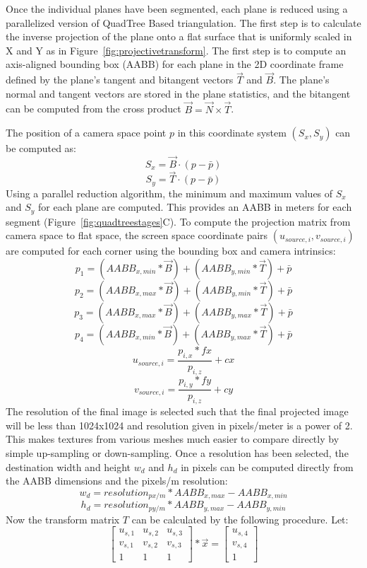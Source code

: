 Once the individual planes have been segmented, each plane is reduced using a parallelized version of QuadTree Based triangulation\cite{planesegmentationQTB}. The first step is to calculate the inverse projection of the plane onto a flat surface that is uniformly scaled in X and Y as in Figure~\ref{fig:projectivetransform}.
The first step is to compute an axis-aligned bounding box (AABB) for each plane in the 2D coordinate frame defined by the plane's tangent and bitangent vectors $\vec{T}$ and $\vec{B}$. The plane's normal and tangent vectors are stored in the plane statistics, and the bitangent can be computed from the cross product $\vec{B}=\vec{N} \times \vec{T}$.\par
The position of a camera space point $p$ in this coordinate system $(S_x,S_y)$ can be computed as: $$S_x=\vec{B} \cdot (p - \bar{p})$$ $$S_y=\vec{T} \cdot (p - \bar{p})$$
Using a parallel reduction algorithm, the minimum and maximum values of $S_x$ and $S_y$ for each plane are computed. This provides an AABB in meters for each segment (Figure~\ref{fig:quadtreestages}C). To compute the projection matrix from camera space to flat space, the screen space coordinate pairs $(u_{source,i},v_{source,i})$ are computed for each corner using the bounding box and camera intrinsics: 
$$p_1 = (AABB_{x,min} * \vec{B})+(AABB_{y,min} * \vec{T})+\bar{p}$$
$$p_2 = (AABB_{x,max} * \vec{B})+(AABB_{y,min} * \vec{T})+\bar{p}$$
$$p_3 = (AABB_{x,max} * \vec{B})+(AABB_{y,max} * \vec{T})+\bar{p}$$
$$p_4 = (AABB_{x,min} * \vec{B})+(AABB_{y,max} * \vec{T})+\bar{p}$$
$$u_{source,i} = \frac{p_{i,x}*fx}{p_{i,z}} + cx$$
$$v_{source,i} = \frac{p_{i,y}*fy}{p_{i,z}} + cy$$
The resolution of the final image is selected such that the final projected image will be less than 1024x1024 and resolution given in pixels/meter is a power of 2. This makes textures from various meshes much easier to compare directly by simple up-sampling or down-sampling. Once a resolution has been selected, the destination width and height $w_d$ and $h_d$ in pixels can be computed directly from the AABB dimensions and the pixels/m resolution: 
$$w_d=resolution_{px/m} * {AABB_{x,max}-AABB_{x,min}}$$
$$h_d=resolution_{py/m} * {AABB_{y,max}-AABB_{y,min}}$$
Now the transform matrix $T$ can be calculated by the following procedure. Let:
$$\begin{bmatrix}
  u_{s,1} & u_{s,2} & u_{s,3} \\
  v_{s,1} & v_{s,2} & v_{s,3} \\
  1 & 1 & 1 
 \end{bmatrix} * \vec{x} = \begin{bmatrix}
  u_{s,4} \\
  v_{s,4} \\
  1
 \end{bmatrix}$$
